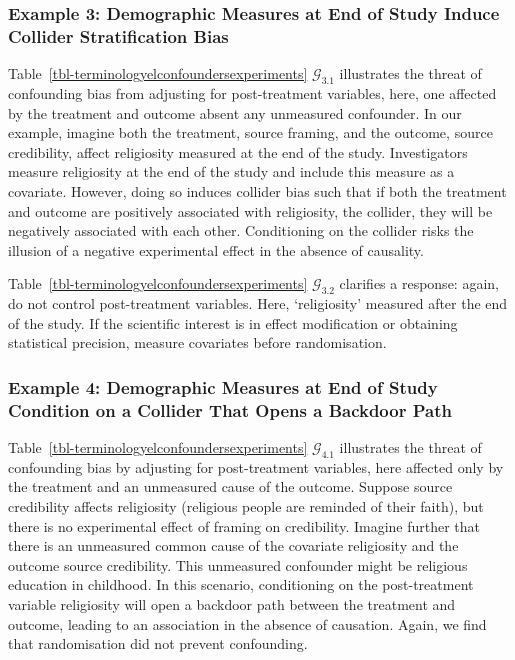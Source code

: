 \documentclass[
  single column]{article}
\begin{document}
\subsubsection{Example 3: Demographic Measures at End of Study Induce
Collider Stratification
Bias}\label{example-3-demographic-measures-at-end-of-study-induce-collider-stratification-bias}

Table~\ref{tbl-terminologyelconfoundersexperiments}
\(\mathcal{G}_{3.1}\) illustrates the threat of confounding bias from
adjusting for post-treatment variables, here, one affected by the
treatment and outcome absent any unmeasured confounder. In our example,
imagine both the treatment, source framing, and the outcome, source
credibility, affect religiosity measured at the end of the study.
Investigators measure religiosity at the end of the study and include
this measure as a covariate. However, doing so induces collider bias
such that if both the treatment and outcome are positively associated
with religiosity, the collider, they will be negatively associated with
each other. Conditioning on the collider risks the illusion of a
negative experimental effect in the absence of causality.

Table~\ref{tbl-terminologyelconfoundersexperiments}
\(\mathcal{G}_{3.2}\) clarifies a response: again, do not control
post-treatment variables. Here, `religiosity' measured after the end of
the study. If the scientific interest is in effect modification or
obtaining statistical precision, measure covariates before
randomisation.

\subsubsection{Example 4: Demographic Measures at End of Study Condition
on a Collider That Opens a Backdoor
Path}\label{example-4-demographic-measures-at-end-of-study-condition-on-a-collider-that-opens-a-backdoor-path}

Table~\ref{tbl-terminologyelconfoundersexperiments}
\(\mathcal{G}_{4.1}\) illustrates the threat of confounding bias by
adjusting for post-treatment variables, here affected only by the
treatment and an unmeasured cause of the outcome. Suppose source
credibility affects religiosity (religious people are reminded of their
faith), but there is no experimental effect of framing on credibility.
Imagine further that there is an unmeasured common cause of the
covariate religiosity and the outcome source credibility. This
unmeasured confounder might be religious education in childhood. In this
scenario, conditioning on the post-treatment variable religiosity will
open a backdoor path between the treatment and outcome, leading to an
association in the absence of causation. Again, we find that
randomisation did not prevent confounding.
\end{document}
